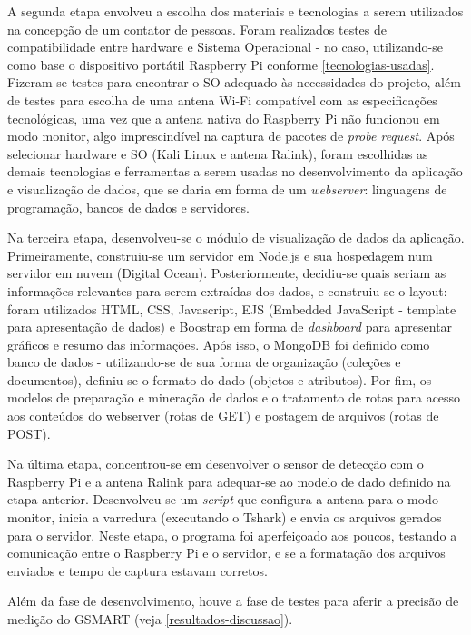 A segunda etapa envolveu a escolha dos materiais e tecnologias a serem
utilizados na concepção de um contator de pessoas. Foram realizados testes de
compatibilidade entre hardware e Sistema Operacional - no caso, utilizando-se
como base o dispositivo portátil Raspberry Pi conforme
\autoref{tecnologias-usadas}. Fizeram-se testes para encontrar o SO adequado às
necessidades do projeto, além de testes para escolha de uma antena Wi-Fi
compatível com as especificações tecnológicas, uma vez que a antena nativa do
Raspberry Pi não funcionou em modo monitor, algo imprescindível na captura de
pacotes de \emph{probe request}. Após selecionar hardware e SO (Kali Linux e antena Ralink), foram escolhidas as demais
tecnologias e ferramentas a serem usadas no desenvolvimento da aplicação e
visualização de dados, que se daria em forma de um \emph{webserver}: linguagens
de programação, bancos de dados e servidores.

Na terceira etapa, desenvolveu-se o módulo de visualização de dados da aplicação.
Primeiramente, construiu-se um servidor em Node.js e sua hospedagem num servidor em nuvem (Digital Ocean). Posteriormente, decidiu-se quais seriam as informações relevantes para serem extraídas dos dados, e construiu-se o layout: foram utilizados HTML, CSS, Javascript, EJS (Embedded
JavaScript - template para apresentação de dados) e Boostrap em forma de
\emph{dashboard} para apresentar gráficos e resumo das informações. Após isso, o
MongoDB foi definido como banco de dados - utilizando-se de sua forma de
organização (coleções e documentos), definiu-se o formato do dado (objetos e
atributos). Por fim, os modelos de preparação e mineração  de dados e o tratamento de rotas para acesso aos conteúdos do webserver (rotas de GET) e postagem de arquivos (rotas de POST).

Na última etapa, concentrou-se em desenvolver o sensor de detecção com o Raspberry Pi e a antena Ralink para adequar-se ao modelo de dado definido na etapa anterior. Desenvolveu-se um \emph{script} que configura a antena para o modo monitor, inicia a varredura (executando o Tshark) e envia os arquivos gerados para o servidor. Neste etapa, o programa foi aperfeiçoado aos poucos, testando a comunicação entre o Raspberry Pi e o servidor, e se a formatação dos arquivos enviados e tempo de captura estavam corretos.

Além da fase de desenvolvimento, houve a fase de testes para aferir a precisão de medição do GSMART (veja \autoref{resultados-discussao}).
